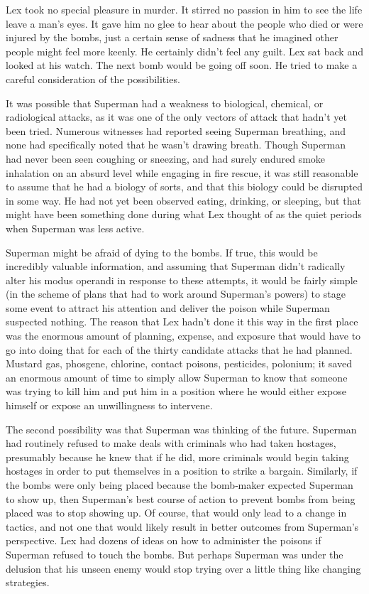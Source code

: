Lex took no special pleasure in murder. It stirred no passion in him to
see the life leave a man's eyes. It gave him no glee to hear about the
people who died or were injured by the bombs, just a certain sense of
sadness that he imagined other people might feel more keenly. He
certainly didn't feel any guilt. Lex sat back and looked at his watch.
The next bomb would be going off soon. He tried to make a careful
consideration of the possibilities.

It was possible that Superman had a weakness to biological, chemical, or
radiological attacks, as it was one of the only vectors of attack that
hadn't yet been tried. Numerous witnesses had reported seeing Superman
breathing, and none had specifically noted that he wasn't drawing
breath. Though Superman had never been seen coughing or sneezing, and
had surely endured smoke inhalation on an absurd level while engaging in
fire rescue, it was still reasonable to assume that he had a biology of
sorts, and that this biology could be disrupted in some way. He had not
yet been observed eating, drinking, or sleeping, but that might have
been something done during what Lex thought of as the quiet periods when
Superman was less active.

Superman might be afraid of dying to the bombs. If true, this would be
incredibly valuable information, and assuming that Superman didn't
radically alter his modus operandi in response to these attempts, it
would be fairly simple (in the scheme of plans that had to work around
Superman's powers) to stage some event to attract his attention and
deliver the poison while Superman suspected nothing. The reason that Lex
hadn't done it this way in the first place was the enormous amount of
planning, expense, and exposure that would have to go into doing that
for each of the thirty candidate attacks that he had planned. Mustard
gas, phosgene, chlorine, contact poisons, pesticides, polonium; it saved
an enormous amount of time to simply allow Superman to know that someone
was trying to kill him and put him in a position where he would either
expose himself or expose an unwillingness to intervene.

The second possibility was that Superman was thinking of the future.
Superman had routinely refused to make deals with criminals who had
taken hostages, presumably because he knew that if he did, more
criminals would begin taking hostages in order to put themselves in a
position to strike a bargain. Similarly, if the bombs were only being
placed because the bomb‐maker expected Superman to show up, then
Superman's best course of action to prevent bombs from being placed was
to stop showing up. Of course, that would only lead to a change in
tactics, and not one that would likely result in better outcomes from
Superman's perspective. Lex had dozens of ideas on how to administer the
poisons if Superman refused to touch the bombs. But perhaps Superman was
under the delusion that his unseen enemy would stop trying over a little
thing like changing strategies.

